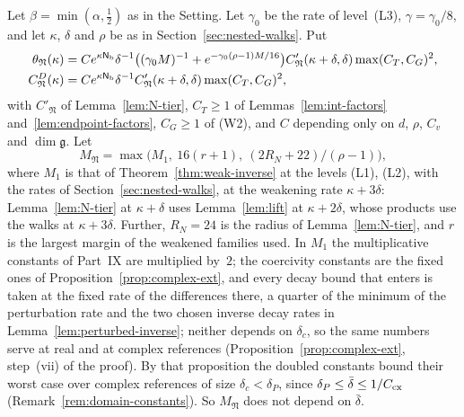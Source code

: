 \begin{proposition}\label{prop:nl-tiers}
Let $\beta=\min(\alpha,\frac12)$ as in the Setting. Let $\gamma_0$ be the rate of level~(L3), $\gamma=\gamma_0/8$, and let $\kappa$, $\delta$ and $\rho$ be as in Section~\ref{sec:nested-walks}. Put
\[
\begin{aligned}
\theta_{\mathfrak N}(\kappa)&=Ce^{\kappa\mathsf N_{\rm b}}\delta^{-1}\big((\gamma_0M)^{-1}+e^{-\gamma_0(\rho-1)M/16}\big)C'_{\mathfrak N}(\kappa+\delta,\delta)\max(C_T,C_G)^2,\\
C^D_{\mathfrak N}(\kappa)&=Ce^{\kappa\mathsf N_{\rm b}}\delta^{-1}C'_{\mathfrak N}(\kappa+\delta,\delta)\max(C_T,C_G)^2,
\end{aligned}
\]
with $C'_{\mathfrak N}$ of Lemma~\ref{lem:N-tier}, $C_T\ge1$ of Lemmas~\ref{lem:int-factors} and~\ref{lem:endpoint-factors}, $C_G\ge1$ of (W2), and $C$ depending only on $d$, $\rho$, $C_v$ and $\dim\mathfrak g$. Let
\[
M_{\mathfrak N}=\max\big(M_1,\ 16(r+1),\ (2R_N+22)/(\rho-1)\big),
\]
where $M_1$ is that of Theorem~\ref{thm:weak-inverse} at the levels (L1), (L2), with the rates of Section~\ref{sec:nested-walks}, at the weakening rate $\kappa+3\delta$: Lemma~\ref{lem:N-tier} at $\kappa+\delta$ uses Lemma~\ref{lem:lift} at $\kappa+2\delta$, whose products use the walks at $\kappa+3\delta$. Further, $R_N=24$ is the radius of Lemma~\ref{lem:N-tier}, and $r$ is the largest margin of the weakened families used. In $M_1$ the multiplicative constants of Part~IX are multiplied by~$2$; the coercivity constants are the fixed ones of Proposition~\ref{prop:complex-ext}, and every decay bound that enters is taken at the fixed rate of the differences there, a quarter of the minimum of the perturbation rate and the two chosen inverse decay rates in Lemma~\ref{lem:perturbed-inverse}; neither depends on $\delta_c$, so the same numbers serve at real and at complex references (Proposition~\ref{prop:complex-ext}, step~(vii) of the proof). By that proposition the doubled constants bound their worst case over complex references of size $\delta_c<\delta_P$, since $\delta_P\le\bar\delta\le1/C_{\rm cx}$ (Remark~\ref{rem:domain-constants}). So $M_{\mathfrak N}$ does not depend on $\bar\delta$.


\end{proposition}
